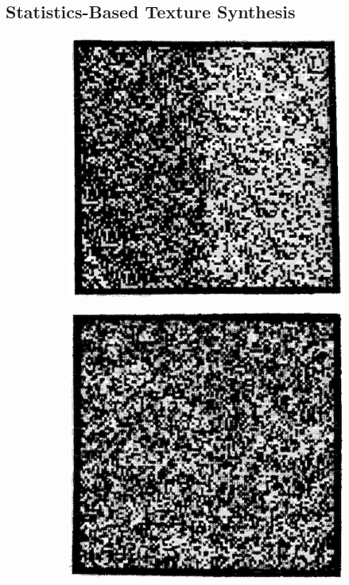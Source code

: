 \subsection{Statistics-Based Texture Synthesis}
\label{section:background-texture_synthesis-statistics_based}

\begin{figure}[t]
    \centering
    \begin{subfigure}[b]{0.3\textwidth}
        \centering
        \includegraphics[width=\textwidth]{images/02-julesz-1st_order.jpg}
        \caption{}
    \end{subfigure}
    \hfill
    \begin{subfigure}[b]{0.29\textwidth}
        \centering
        \includegraphics[width=\textwidth]{images/02-julesz-2nd_order.jpg}

\end{subfigure}
\end{figure}
